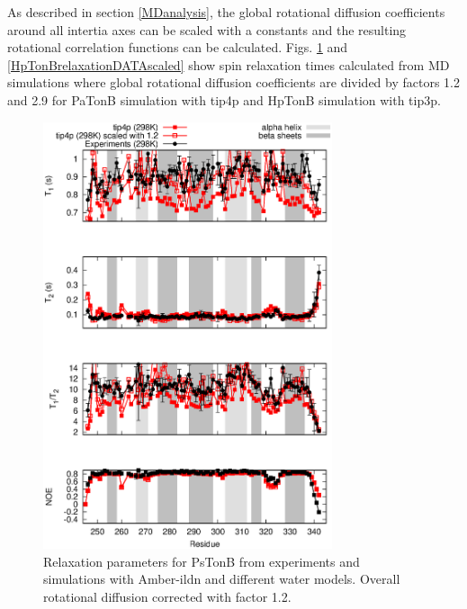 \documentclass[pre,aps,floatfix,authordate1-4,twocolumn]{revtex4-1}
\begin{document}
As described in section \ref{MDanalysis}, the global rotational diffusion coefficients
around all intertia axes can be scaled with a constants and the resulting rotational
correlation functions can be calculated. Figs. \ref{PsTonBrelaxationDATAscaled} and
\ref{HpTonBrelaxationDATAscaled} show spin relaxation times calculated from MD simulations
where global rotational diffusion coefficients are divided by factors 1.2 and 2.9
for PaTonB simulation with tip4p and HpTonB simulation with tip3p.
\begin{figure}[!h]
  \includegraphics[width=8.5cm]{../Figs/PsTonBrelaxationDATAscaled.eps}%
  \caption{Relaxation parameters for PsTonB from
    experiments and simulations with Amber-ildn and different water models.
    Overall rotational diffusion corrected with factor 1.2.    
    \label{PsTonBrelaxationDATAscaled}}%
\end{figure}
\end{document}
